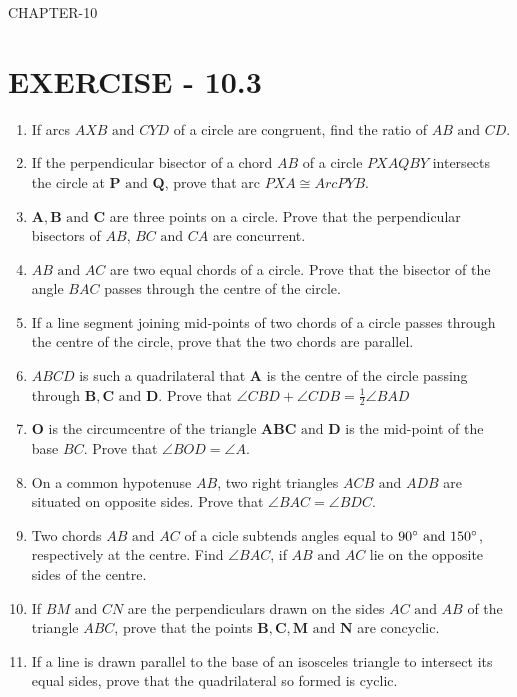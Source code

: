 \documentclass[12pt]{article}
\let\vec\mathbf
\begin{document}
\begin{center}
\textbf\large{CHAPTER-10}
\end{center}

\section{EXERCISE - 10.3}
\begin{enumerate}
\item If arcs ${AXB}\text{ and }{CYD}$ of a circle are congruent, find the ratio of ${AB}\text{ and }{CD}$.
\item If the perpendicular bisector of a chord ${AB}$ of a circle ${PXAQBY}$ intersects the circle at $\vec{P}\text{ and }\vec{Q}$, prove that arc ${PXA}\cong Arc  {PYB}$.
\item $\vec{A},\vec{B}\text{ and }\vec{C}$ are three points on a circle. Prove that the perpendicular bisectors of ${AB}$, ${BC}\text{ and }{CA}$ are concurrent.
\item ${AB}\text{ and }{AC}$ are two equal chords of a circle. Prove that the bisector of the angle ${BAC}$ passes through the centre of the circle.
\item If a line segment joining mid-points of two chords of a circle passes through the centre of the circle, prove that the two chords are parallel.
\item ${ABCD}$ is such a quadrilateral that $\vec{A}$ is the centre of the circle passing through $\vec{B},\vec{C}\text{ and }\vec{D}$. Prove that $\angle CBD+ \angle CDB = \frac{1}{2} \angle BAD$
\item $\vec{O}$ is the circumcentre of the triangle $\vec{ABC}\text{ and }\vec{D}$ is the mid-point of the base ${BC}$. Prove that $\angle BOD = \angle A$.
\item On a common hypotenuse ${AB}$, two right triangles ${ACB}\text{ and }{ADB}$ are situated on opposite sides. Prove that $\angle BAC = \angle BDC$.
\item Two chords ${AB}\text{ and }{AC}$ of a cicle subtends angles equal to $90\degree \text{ and }150\degree$, respectively at the centre. Find $\angle BAC$, if ${AB}\text{ and }{AC}$ lie on the opposite sides of the centre.
\item If ${BM}\text{ and }{CN}$ are the perpendiculars drawn on the sides ${AC}\text{ and }{AB}$ of the triangle ${ABC}$, prove that the points $\vec{B},\vec{C},\vec{M}\text{ and }\vec{N}$ are concyclic.
\item If a line is drawn parallel to the base of an isosceles triangle to intersect its equal sides, prove that the quadrilateral so formed is cyclic.

\end{enumerate}
\end{document}
